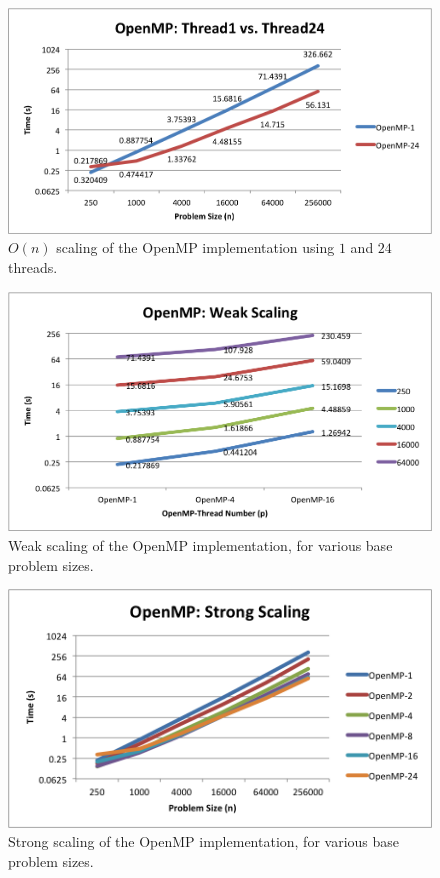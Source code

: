 \documentclass{article}
\begin{document}
\begin{figure}
  \includegraphics[width=\textwidth]{plots/OpenMP-Thread1-vs-Thread24.png}
  \caption{$O(n)$ scaling of the OpenMP implementation using $1$ and $24$ threads.}
  \label{fig:openmp-on}
\end{figure}

\begin{figure}
  \includegraphics[width=\textwidth]{plots/OpenMP-weak-scaling.png}
  \caption{Weak scaling of the OpenMP implementation, for various base problem sizes.}
  \label{fig:openmp-weak}
\end{figure}

\begin{figure}
  \includegraphics[width=\textwidth]{plots/OpenMP-Strong-scaling.png}
  \caption{Strong scaling of the OpenMP implementation, for various base problem sizes.}
  \label{fig:openmp-strong}
\end{figure}
\end{document}
